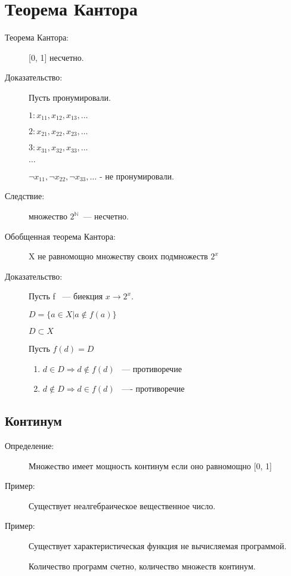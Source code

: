 \documentclass[12pt]{article}
\begin{document}
\section{Теорема Кантора}  

\begin{description}
\item[Теорема Кантора:] [0, 1] несчетно.
\item[Доказательство:] 

Пусть пронумировали.

$1: x_{11}, x_{12}, x_{13}, \ldots$

$2: x_{21}, x_{22}, x_{23}, \ldots$

$3: x_{31}, x_{32}, x_{33}, \ldots$

$\ldots$

$\neg x_{11}, \neg x_{22}, \neg x_{33}, \ldots$ - не пронумировали.

\item[Следствие:] множество $2^{\mathbb N}$~--- несчетно.

\item [Обобщенная теорема Кантора:] X не равномощно множеству своих подмножеств $2^x$
\item [Доказательство:] Пусть f ~--- биекция $x \to 2^x$.

$D = \{a \in X| a \notin f(a)\}$

$D \subset X$

Пусть $f(d) = D$

\begin{enumerate}
\item $d \in D \Rightarrow d \notin f(d)$ ~--- противоречие
\item $d \notin D \Rightarrow d \in f(d)$ ~---- противоречие
\end{enumerate}
\end{description}

\subsection{Континум}

\begin{description}
\item[Определение:] Множество имеет мощность континум если оно равномощно [0, 1]
\item[Пример:] Существует неалгебраическое вещественное число. 
\item[Пример:] Существует характеристическая функция не вычисляемая программой. 

Количество программ счетно, количество множеств континум.
\end{description}
\end{document}
